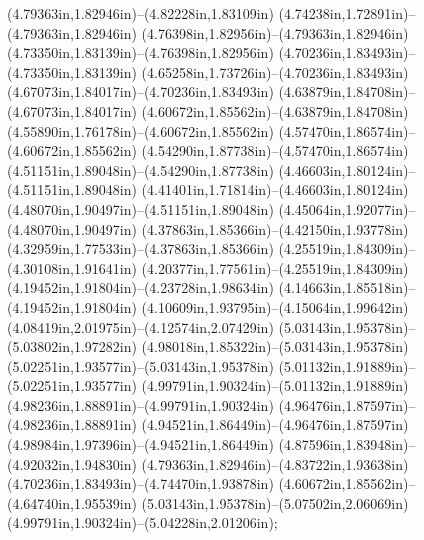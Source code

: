 (4.79363in,1.82946in)--(4.82228in,1.83109in) (4.74238in,1.72891in)--(4.79363in,1.82946in) (4.76398in,1.82956in)--(4.79363in,1.82946in) (4.73350in,1.83139in)--(4.76398in,1.82956in) (4.70236in,1.83493in)--(4.73350in,1.83139in) (4.65258in,1.73726in)--(4.70236in,1.83493in) (4.67073in,1.84017in)--(4.70236in,1.83493in) (4.63879in,1.84708in)--(4.67073in,1.84017in) (4.60672in,1.85562in)--(4.63879in,1.84708in) (4.55890in,1.76178in)--(4.60672in,1.85562in) (4.57470in,1.86574in)--(4.60672in,1.85562in) (4.54290in,1.87738in)--(4.57470in,1.86574in) (4.51151in,1.89048in)--(4.54290in,1.87738in) (4.46603in,1.80124in)--(4.51151in,1.89048in) (4.41401in,1.71814in)--(4.46603in,1.80124in) (4.48070in,1.90497in)--(4.51151in,1.89048in) (4.45064in,1.92077in)--(4.48070in,1.90497in) (4.37863in,1.85366in)--(4.42150in,1.93778in) (4.32959in,1.77533in)--(4.37863in,1.85366in) (4.25519in,1.84309in)--(4.30108in,1.91641in) (4.20377in,1.77561in)--(4.25519in,1.84309in) (4.19452in,1.91804in)--(4.23728in,1.98634in) (4.14663in,1.85518in)--(4.19452in,1.91804in) (4.10609in,1.93795in)--(4.15064in,1.99642in) (4.08419in,2.01975in)--(4.12574in,2.07429in) (5.03143in,1.95378in)--(5.03802in,1.97282in) (4.98018in,1.85322in)--(5.03143in,1.95378in) (5.02251in,1.93577in)--(5.03143in,1.95378in) (5.01132in,1.91889in)--(5.02251in,1.93577in) (4.99791in,1.90324in)--(5.01132in,1.91889in) (4.98236in,1.88891in)--(4.99791in,1.90324in) (4.96476in,1.87597in)--(4.98236in,1.88891in) (4.94521in,1.86449in)--(4.96476in,1.87597in) (4.98984in,1.97396in)--(4.94521in,1.86449in) (4.87596in,1.83948in)--(4.92032in,1.94830in) (4.79363in,1.82946in)--(4.83722in,1.93638in) (4.70236in,1.83493in)--(4.74470in,1.93878in) (4.60672in,1.85562in)--(4.64740in,1.95539in) (5.03143in,1.95378in)--(5.07502in,2.06069in) (4.99791in,1.90324in)--(5.04228in,2.01206in);
